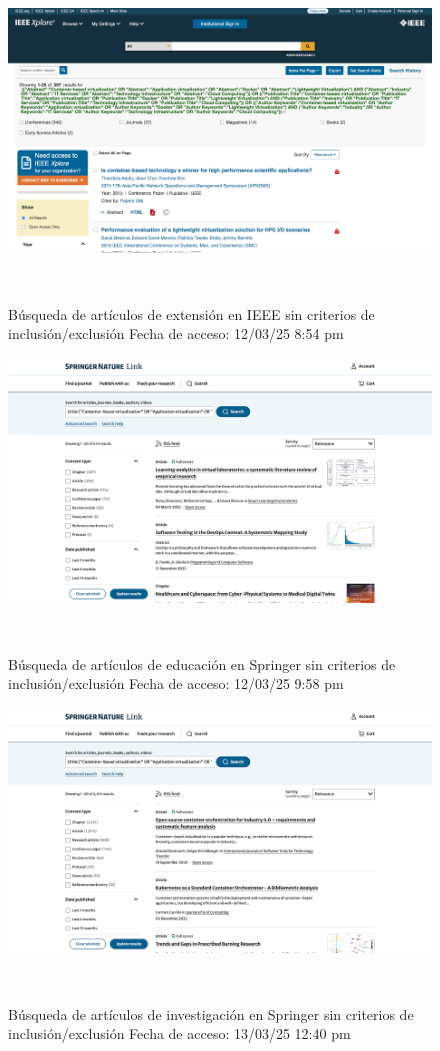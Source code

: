 \FloatBarrier\begin{figure}[H]
    \centering
    \includegraphics[width=\textwidth,keepaspectratio]{apendices/BD/sin-criterios/IEEE-ind.png}
    \caption{Búsqueda de artículos de extensión en IEEE sin criterios de inclusión/exclusión
    Fecha de acceso: 12/03/25 8:54 pm
    }\
\end{figure}
\FloatBarrier\begin{figure}[H]
    \centering
    \includegraphics[width=\textwidth,keepaspectratio]{apendices/BD/sin-criterios/Springer-ed.png}
    \caption{Búsqueda de artículos de educación en Springer sin criterios de inclusión/exclusión
    Fecha de acceso: 12/03/25 9:58 pm
    }\
\end{figure}
\FloatBarrier\begin{figure}[H]
    \centering
    \includegraphics[width=\textwidth,keepaspectratio]{apendices/BD/sin-criterios/Springer-inv.png}
    \caption{Búsqueda de artículos de investigación en Springer sin criterios de inclusión/exclusión
    Fecha de acceso: 13/03/25 12:40 pm
    }\
\end{figure}
